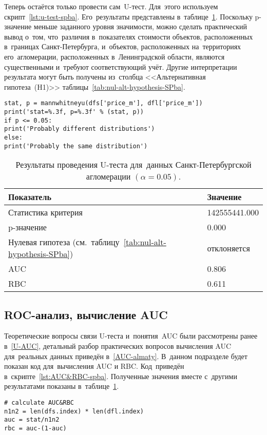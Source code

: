\documentclass[]{scrreprt}
\begin{document}
Теперь остаётся только провести сам~U-тест. Для~этого используем скрипт~\ref{lst:u-test-spba}. Его~результаты представлены в~таблице~\ref{tab:u-test-py-result}. Поскольку p-значение меньше заданного уровня значимости, можно сделать практический вывод о~том, что~различия в~показателях стоимости объектов, расположенных в~границах Санкт-Петербурга, и~объектов, расположенных на~территориях его~агломерации, расположенных в~Ленинградской области, являются существенными и~требуют соответствующий учёт. Другие интерпретации результата могут быть получены из~столбца <<Альтернативная гипотеза~(H1)>> таблицы~\ref{tab:nul-alt-hypothesis-SPba}.
%
\begin{lstlisting}[float, caption = Проведение теста Манна"--~Уитни-Уилкоксона для~данных удельных цен предложения квартир в~агломерации Санкт-Петербурга, firstnumber=1, label= lst:u-test-spba]
stat, p = mannwhitneyu(dfs['price_m'], dfl['price_m'])
print('stat=%.3f, p=%.3f' % (stat, p))
if p <= 0.05:
print('Probably different distributions')
else:
print('Probably the same distribution')
\end{lstlisting}  
%
\begin{table}[ht]
	\caption{Результаты проведения U-теста для~данных Санкт-Петербургской агломерации $({\textstyle \alpha=0.05})$.}\label{tab:u-test-py-result}
	\centering
	\begin{tabular}{ll}
		\hline
	Показатель&Значение\\
		\hline
	Статистика критерия&142555441.000\\
		\hline
	p-значение&0.000\\
		\hline
	Нулевая гипотеза (см.~таблицу~\ref{tab:nul-alt-hypothesis-SPba})&отклоняется\\
		\hline
	AUC&0.806\\
	\hline
	RBC&0.611\\
	\hline
	\end{tabular}
\end{table}

\subsection{ROC-анализ, вычисление AUC}
Теоретические вопросы связи U-теста и~понятия~AUC были рассмотрены ранее в~\ref{U-AUC}, детальный разбор практических вопросов вычисления AUC для~реальных данных приведён в~\ref{AUC-almaty}. В~данном подразделе будет показан код для~вычисления AUC и RBC. Код~приведён в~скрипте~\ref{lst:AUC&RBC-spba}. Полученные значения вместе с~другими результатами показаны в~таблице~\ref{tab:u-test-py-result}.
%
\begin{lstlisting}[float, caption = Вычисление AUC и~RBC для~данных Санкт-Петербургской агломерации, firstnumber=1, label= lst:AUC&RBC-spba]
# calculate AUC&RBC
n1n2 = len(dfs.index) * len(dfl.index)
auc = stat/n1n2
rbc = auc-(1-auc)
\end{lstlisting}  
%
\clearpage
\end{document}
